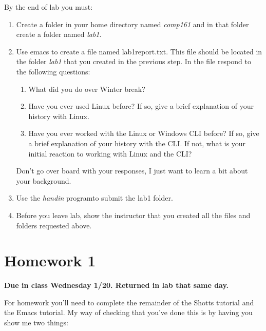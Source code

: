 \documentclass[]{tufte-handout}
\begin{document}
By the end of lab you must: 
\begin{enumerate}
\item Create a folder in your home directory named \textit{comp161} and in that folder create a folder named \textit{lab1}.
\item Use emacs to create a file named lab1report.txt. This file should be located in the folder \textit{lab1} that you created in the previous step. In the file respond to the following questions:
\begin{enumerate}
\item What did you do over Winter break?
\item Have you ever used Linux before? If so, give a brief explanation of your history with Linux.
\item Have you ever worked with the Linux or Windows CLI before? If so, give a brief explanation of your history with the CLI. If not, what is your initial reaction to working with Linux and the CLI?
\end{enumerate}
Don't go over board with your responses, I just want to learn a bit about your background.
\item Use the \textit{handin} programto submit the lab1 folder.
\item Before you leave lab, show the instructor that you created all the files and folders requested above.    
\end{enumerate}

\section{Homework 1}

\begin{center}
\textbf{Due in class Wednesday 1/20. Returned in lab that same day.}
\end{center}

For homework you'll need to complete the remainder of the Shotts tutorial and the Emacs tutorial.  My way of checking that you've done this is by having you show me two things:
\end{document}

